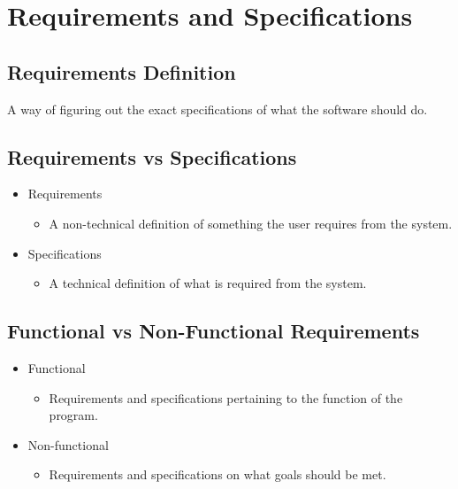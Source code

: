 \documentclass{article}
\begin{document}
\section{Requirements and Specifications}

    \subsection{Requirements Definition}

        A way of figuring out the exact specifications of what the software should do.

    \subsection{Requirements vs Specifications}
    
        \begin{itemize}
            \item Requirements
            \begin{itemize}
                \item A non-technical definition of something the user requires from the system.
            \end{itemize}
            \item Specifications
            \begin{itemize}
                \item A technical definition of what is required from the system.
            \end{itemize}
        \end{itemize}

    \subsection{Functional vs Non-Functional Requirements}

    \begin{itemize}
        \item Functional
        \begin{itemize}
            \item Requirements and specifications pertaining to the function of the program.
        \end{itemize}
        \item Non-functional
        \begin{itemize}
            \item Requirements and specifications on what goals should be met.
        \end{itemize}
    \end{itemize}
\end{document}

